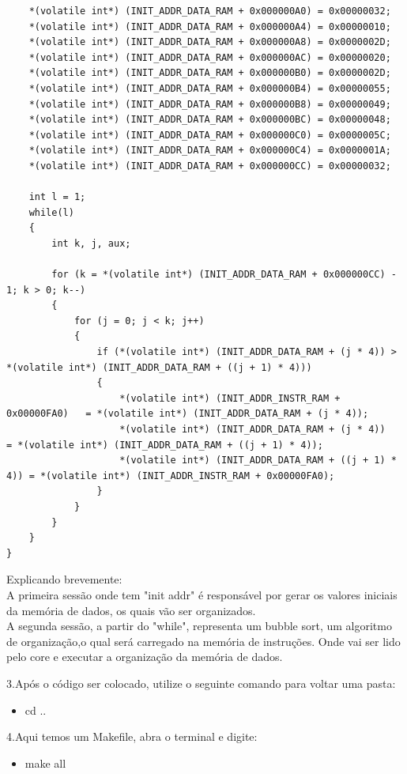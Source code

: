 \begin{lstlisting}
	*(volatile int*) (INIT_ADDR_DATA_RAM + 0x000000A0) = 0x00000032;
	*(volatile int*) (INIT_ADDR_DATA_RAM + 0x000000A4) = 0x00000010;
	*(volatile int*) (INIT_ADDR_DATA_RAM + 0x000000A8) = 0x0000002D;
	*(volatile int*) (INIT_ADDR_DATA_RAM + 0x000000AC) = 0x00000020;
	*(volatile int*) (INIT_ADDR_DATA_RAM + 0x000000B0) = 0x0000002D;
	*(volatile int*) (INIT_ADDR_DATA_RAM + 0x000000B4) = 0x00000055;
	*(volatile int*) (INIT_ADDR_DATA_RAM + 0x000000B8) = 0x00000049;
	*(volatile int*) (INIT_ADDR_DATA_RAM + 0x000000BC) = 0x00000048;
	*(volatile int*) (INIT_ADDR_DATA_RAM + 0x000000C0) = 0x0000005C;
	*(volatile int*) (INIT_ADDR_DATA_RAM + 0x000000C4) = 0x0000001A;
	*(volatile int*) (INIT_ADDR_DATA_RAM + 0x000000CC) = 0x00000032; 

	int l = 1;
	while(l)
	{
		int k, j, aux;

		for (k = *(volatile int*) (INIT_ADDR_DATA_RAM + 0x000000CC) - 1; k > 0; k--)
		{
			for (j = 0; j < k; j++)
			{
				if (*(volatile int*) (INIT_ADDR_DATA_RAM + (j * 4)) > *(volatile int*) (INIT_ADDR_DATA_RAM + ((j + 1) * 4)))
				{
					*(volatile int*) (INIT_ADDR_INSTR_RAM + 0x00000FA0)   = *(volatile int*) (INIT_ADDR_DATA_RAM + (j * 4));
					*(volatile int*) (INIT_ADDR_DATA_RAM + (j * 4))       = *(volatile int*) (INIT_ADDR_DATA_RAM + ((j + 1) * 4));
					*(volatile int*) (INIT_ADDR_DATA_RAM + ((j + 1) * 4)) = *(volatile int*) (INIT_ADDR_INSTR_RAM + 0x00000FA0);
				}
			}
		}
	}
}
\end{lstlisting}

Explicando brevemente:
\\
A primeira sessão onde tem "init addr" é responsável por gerar os valores iniciais da memória de dados, os quais vão ser organizados.
\\
A segunda sessão, a partir do "while", representa um bubble sort, um algoritmo de organização,o qual será carregado na memória de instruções. Onde vai ser lido pelo core e executar a organização da memória de dados. 
\\

\par 3.Após o código ser colocado, utilize o seguinte comando para voltar uma pasta:

\begin{itemize}
  \item cd ..
\end{itemize}
\par 4.Aqui temos um Makefile, abra o terminal e digite:

\begin{itemize}
  \item make all
\end{itemize}

